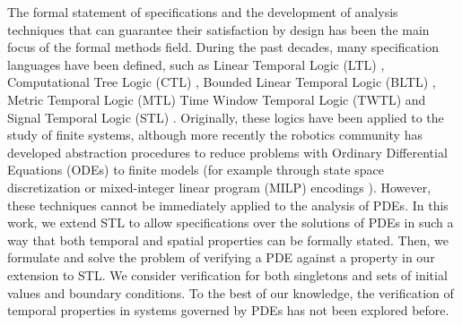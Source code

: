 \documentclass[letterpaper, 10 pt, conference]{ieeeconf/ieeeconf}
\begin{document}
The formal statement of specifications and the development of
analysis techniques that can guarantee their satisfaction by design has been the main
focus of the formal methods field. During the past decades, many specification
languages have been defined, such as Linear Temporal
Logic (LTL) \cite{gerth_simple_1996}, Computational Tree Logic (CTL)
\cite{clarke_automatic_1986}, Bounded Linear Temporal Logic 
(BLTL) \cite{jha_bayesian_2009}, Metric Temporal Logic (MTL) \cite{luo_using_2016} 
Time Window Temporal Logic (TWTL) \cite{AkVaBe-ICRA-2016} and Signal Temporal Logic (STL) 
\cite{donze_robust_2010}. Originally, these logics have been applied to the
study of finite systems, although more recently the robotics community has
developed abstraction procedures to reduce problems with Ordinary
Differential Equations (ODEs) to finite models (for example through state space
discretization or mixed-integer linear program (MILP) encodings
\cite{sadraddini_robust_2015}).
However, these techniques cannot be immediately applied to the analysis of PDEs.
In this work, we extend STL to allow
specifications over the solutions of PDEs in such a way that both temporal and
spatial properties can be formally stated. Then, we formulate and solve the problem 
of verifying a PDE against a property in our extension to STL. We consider verification
for both singletons and sets of initial values and boundary conditions.
To the best of our knowledge, the verification 
of temporal properties in systems governed by PDEs has not been explored before.




\end{document}
